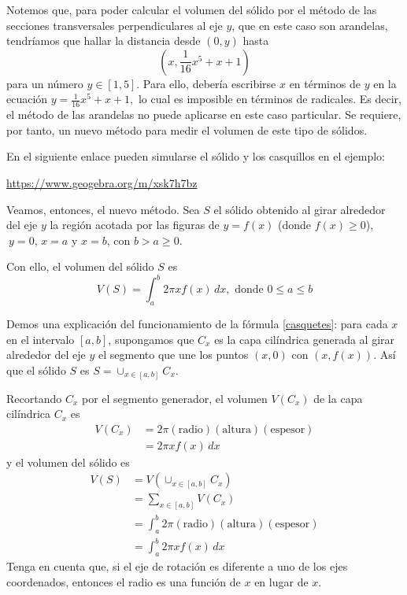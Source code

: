 Notemos que, para poder calcular el volumen del sólido por el método de las secciones transversales perpendiculares al eje $y$, que en este caso son arandelas, tendríamos que hallar la distancia desde $(0,y)$ hasta
\[\left( x,\frac{1}{16}x^{5}+x+1\right)\]
para un número $y\in [1,5]$. Para ello, debería escribirse $x$ en términos de $y$ en la ecuación $y=\frac{1}{16}x^{5}+x+1,$ lo cual es imposible en términos de radicales. Es decir, el método de las arandelas no puede aplicarse en este caso particular. Se requiere, por tanto, un nuevo método para medir el volumen de este tipo de sólidos.

En el siguiente enlace pueden simularse el sólido y los casquillos en el ejemplo:

\begin{center}
  \url{https://www.geogebra.org/m/xsk7h7bz}
\end{center}

Veamos, entonces, el nuevo método. Sea $S$ el sólido obtenido al girar alrededor del eje $y$ la región acotada por las figuras de $y=f(x)$ (donde $f(x) \geq 0$), $\ y=0$, $x=a$ y $x=b$, con $b>a\geq 0$.

Con ello, el volumen del sólido $S$ es
\begin{equation}\label{casquetes}
  V\left( S\right) =\int_{a}^{b}2\pi xf\left( x\right)\,dx,\text{ donde }0\leq a\leq b
\end{equation}

Demos una explicación del funcionamiento de la fórmula \eqref{casquetes}: para cada $x$ en el intervalo $\left[ a,b\right] $, supongamos que $C_{x}$ es la capa cilíndrica generada al girar alrededor del eje\textbf{ $y$} el segmento que une los puntos $(x,0)$ con $\left( x,f\left( x\right) \right) $. Así que el sólido $S$ es $S=\cup _{x\in \left[ a,b\right] }C_{x}$.

Recortando $C_{x}$ por el segmento generador, el volumen $V\left(
C_{x}\right) $ de la capa cilíndrica $C_{x}$ es
\begin{align*}
  V\left( C_{x}\right) &=2\pi (\text{radio})(\text{altura})\left(\text{espesor}\right)\\
  & =2\pi xf\left( x\right)\,dx
\end{align*}
y el volumen del sólido es
\begin{align*}
  V\left( S\right) &=V\left( \cup_{x\in \left[ a,b\right] }C_{x}\right)
  \\
  &=\sum_{x\in \left[ a,b\right] }V\left( C_{x}\right) \\
  &= \int_{a}^{b}2\pi
  (\text{radio})(\text{altura})\left(\text{espesor}\right) \\
  &=\int_{a}^{b}2\pi xf\left( x\right)\,dx
\end{align*}
Tenga en cuenta que, si el eje de rotación es diferente a uno de los ejes coordenados, entonces el radio es una función de $x$ en lugar de $x$.


